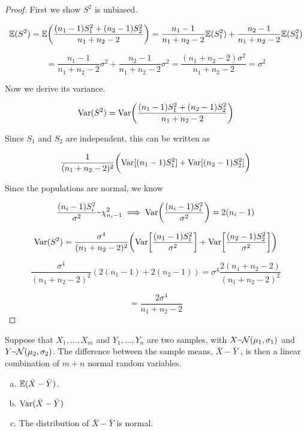 \begin{proof} First we show \(S^2\) is unbiased. 

\[
\E(S^2) = \E \bigg( \frac{(n_1 - 1)S_1^2 + (n_2 - 1)S_2^2}{n_1 + n_2 -2} \bigg) =   \frac{n_1 - 1}{n_1 + n_2 -2}\E (S_1^2 ) +  \frac{n_2 - 1}{n_1 + n_2 -2}\E (S_2^2 )
\]

\[
=   \frac{n_1 - 1}{n_1 + n_2 -2}\sigma^2 +  \frac{n_2 - 1}{n_1 + n_2 -2}\sigma^2 = \frac{(n_1 + n_2 -2)\sigma^2}{n_1 + n_2 -2} = \boxed{\sigma^2}
\]

Now we derive its variance.

\[
\Var(S^2) = \Var \bigg(  \frac{(n_1 - 1)S_1^2 + (n_2 - 1)S_2^2}{n_1 + n_2 -2}  \bigg) 
\]

Since \(S_1\) and \(S_2\) are independent, this can be written as

\[
 \frac{1}{(n_1 + n_2 -2)^2} \bigg(\Var[(n_1 - 1)S_1^2]  +   \Var[(n_2 - 1)S_2^2 ] \bigg)
\]

Since the populations are normal, we know

\[
\frac{(n_i-1)S_i^2}{\sigma^2} \textapprox \chi_{n_i-1}^2 \implies \Var \bigg( \frac{(n_i-1)S_i^2}{\sigma^2} \bigg) = 2(n_i-1)
\]

\[
\Var(S^2) =  \frac{\sigma^4}{(n_1 + n_2 -2)^2} \bigg(\Var\bigg[ \frac{(n_1 - 1)S_1^2}{\sigma^2}\bigg]  +   \Var\bigg[ \frac{(n_2 - 1)S_2^2}{\sigma^2} \bigg] \bigg)
\]

\[
\frac{\sigma^4}{(n_1 + n_2 -2)^2}(2(n_1 - 1) + 2(n_2 - 1)) = \sigma^4 \frac{2(n_1 + n_2 -2)}{(n_1 + n_2 -2)^2}
\]

\[
=  \frac{2 \sigma^4}{n_1 + n_2 -2}
\]

\end{proof}

\begin{proposition} Suppose that \(X_1, \ldots , X_m\) and \(Y_1, \ldots , Y_n\) are two samples, with \(X \textapprox  \mathcal{N}(\mu_1, \sigma_1)\) and \(Y \textapprox  \mathcal{N}(\mu_2, \sigma_2)\). The difference between the sample means, \(\bar{X} - \bar{Y}\) , is then a linear combination of \(m + n\) normal random variables.

\begin{enumerate}[a.]

\item \(\E(\bar{X} - \bar{Y})\).

\item \(\Var (\bar{X} - \bar{Y})\)

\item The distribution of \(\bar{X} - \bar{Y}\) is normal.

\end{enumerate}

\end{proposition}

